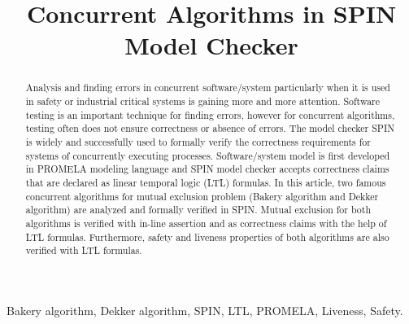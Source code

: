 \documentclass[conference]{IEEEtran}
\begin{document}
\title{Concurrent Algorithms in SPIN Model Checker}

\author{ 
}

\maketitle

\begin{abstract}
Analysis and finding errors in concurrent software/system particularly when it is used in safety or industrial critical systems is gaining more 
and more attention. Software testing is an important technique for finding errors, however for concurrent algorithms, testing often does not ensure 
correctness or absence of errors. The model checker SPIN is widely and successfully used to formally verify the correctness requirements for systems
of concurrently executing processes. Software/system model is first developed in PROMELA modeling language and SPIN model checker accepts correctness
claims that are declared as linear temporal logic (LTL) formulas. In this article, two famous concurrent algorithms for mutual exclusion problem 
(Bakery algorithm and Dekker algorithm) are analyzed and formally verified in SPIN. Mutual exclusion for both algorithms is verified with in-line
assertion and as correctness claims with the help of LTL formulas. Furthermore, safety and liveness properties of both algorithms are also verified 
with LTL formulas.
\end{abstract}

\begin{IEEEkeywords}
Bakery algorithm, Dekker algorithm, SPIN, LTL, PROMELA, Liveness, Safety.
\end{IEEEkeywords}
\IEEEpeerreviewmaketitle
\end{document}
